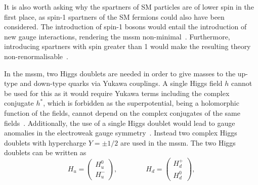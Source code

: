 It is also worth asking why the spartners of SM particles are of lower spin in the first place, as \eg spin-1 spartners of the SM fermions could also have been considered. The introduction of spin-1 bosons would entail the introduction of new gauge interactions, rendering the \gls{mssm} non-minimal~\cite{Bustamante:2009us}. Furthermore, introducing spartners with spin greater than 1 would make the resulting theory non-renormalisable~\cite{Bustamante:2009us}.

In the \gls{mssm}, two Higgs doublets are needed in order to give masses to the up-type and down-type quarks via Yukawa couplings. A single Higgs field $h$ cannot be used for this as it would require Yukawa terms including the complex conjugate $h^*$, which is forbidden as the superpotential, being a holomorphic function of the fields, cannot depend on the complex conjugates of the same fields~\cite{Bustamante:2009us}. Additionally, the use of a single Higgs doublet would lead to gauge anomalies in the electroweak gauge symmetry~\cite{PhysRevD.6.429}. Instead two complex Higgs doublets with hypercharge $Y = \pm 1/2$ are used in the \gls{mssm}. The two Higgs doublets can be written as
\begin{equation}
	H_u = \begin{pmatrix}
		H^0_u \\
		H^-_u
	\end{pmatrix}, \qquad \qquad
	H_d = \begin{pmatrix}
		H^+_d \\
		H^0_d
	\end{pmatrix},
	\label{eq:Higgs_doublets}
\end{equation}

